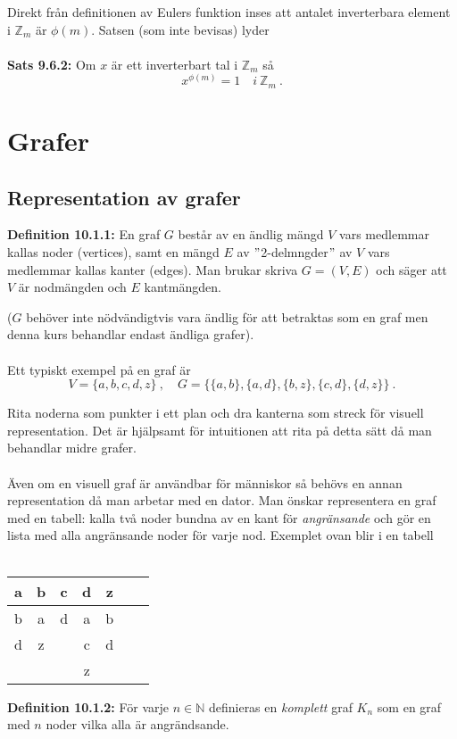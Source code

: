\documentclass{article}
\begin{document}
Direkt från definitionen av Eulers funktion inses att antalet inverterbara element i $\mathbb{Z}_m$ är $\phi(m)$. Satsen (som inte bevisas) lyder\\ \\
\textbf{Sats 9.6.2:} Om $x$ är ett inverterbart tal i $\mathbb{Z}_m$ så
$$
x^{\phi(m)}=1 \quad i \ \mathbb{Z}_m \ .
$$

\section{Grafer}
\subsection{Representation av grafer}
\textbf{Definition 10.1.1:} En graf $G$ består av en ändlig mängd $V$ vars medlemmar kallas noder (vertices), samt en mängd $E$ av $"$2-delmngder$"$ av $V$ vars medlemmar kallas kanter (edges). Man brukar skriva $G=(V,E)$ och säger att $V$ är nodmängden och $E$ kantmängden.

($G$ behöver inte nödvändigtvis vara ändlig för att betraktas som en graf men denna kurs behandlar endast ändliga grafer).\\ \\
Ett typiskt exempel på en graf är
$$
V=\{a,b,c,d,z\} \ , \quad G=\big\{\{a,b\},\{a,d\},\{b,z\},\{c,d\},\{d,z\}\big\} \ .
$$

Rita noderna som punkter i ett plan och dra kanterna som streck för visuell representation. Det är hjälpsamt för intuitionen att rita på detta sätt då man behandlar midre grafer.\\ \\
Även om en visuell graf är användbar för människor så behövs en annan representation då man arbetar med en dator. Man önskar representera en graf med en tabell: kalla två noder bundna av en kant för \textit{angränsande} och gör en lista med alla angränsande noder för varje nod. Exemplet ovan blir i en tabell\\ \\
\begin{center}
\begin{tabular}{l*{5}{c}r}
a & b & c & d & z\\
\hline
b & a & d & a & b \\
d & z & & c & d\\
 & & & z
\end{tabular}
\end{center}
\textbf{Definition 10.1.2:} För varje $n\in\mathbb{N}$ definieras en \textit{komplett} graf $K_n$ som en graf med $n$ noder vilka alla är angrändsande.\\ 
\end{document}
